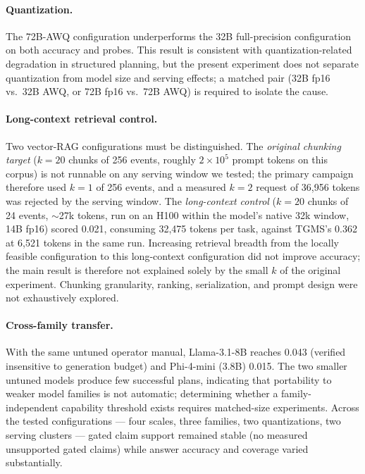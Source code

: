 \documentclass[11pt]{article}
\begin{document}
\paragraph{Quantization.}
The 72B-AWQ configuration underperforms the 32B full-precision
configuration on both accuracy and probes. This result is consistent
with quantization-related degradation in structured planning, but the
present experiment does not separate quantization from model size and
serving effects; a matched pair (32B fp16 vs.\ 32B AWQ, or 72B fp16
vs.\ 72B AWQ) is required to isolate the cause.

\paragraph{Long-context retrieval control.}
Two vector-RAG configurations must be distinguished. The
\emph{original chunking target} ($k{=}20$ chunks of 256 events,
roughly $2\times 10^5$ prompt tokens on this corpus) is not runnable on
any serving window we tested; the primary campaign therefore used
$k{=}1$ of 256 events, and a measured $k{=}2$ request of 36{,}956
tokens was rejected by the serving window. The \emph{long-context
control} ($k{=}20$ chunks of 24 events, ${\sim}$27k tokens, run on an
H100 within the model's native 32k window, 14B fp16) scored 0.021,
consuming 32{,}475 tokens per task, against TGMS's 0.362 at 6{,}521
tokens in the same run. Increasing retrieval breadth from the locally
feasible configuration to this long-context configuration did not
improve accuracy; the main result is therefore not explained solely by
the small $k$ of the original experiment. Chunking granularity,
ranking, serialization, and prompt design were not exhaustively
explored.

\paragraph{Cross-family transfer.}
With the same untuned operator manual, Llama-3.1-8B reaches 0.043
(verified insensitive to generation budget) and Phi-4-mini (3.8B)
0.015. The two smaller untuned models produce few successful plans,
indicating that portability to weaker model families is not automatic;
determining whether a family-independent capability threshold exists
requires matched-size experiments. Across the tested configurations ---
four scales, three families, two quantizations, two serving clusters
--- gated claim support remained stable (no measured unsupported gated
claims) while answer accuracy and coverage varied substantially.
\end{document}
